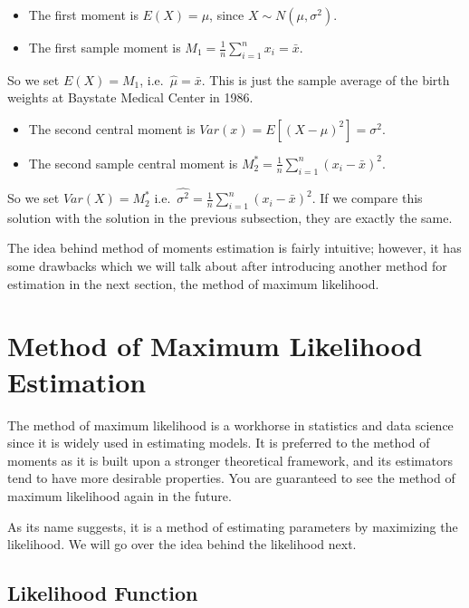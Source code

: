 \documentclass[
]{book}
\providecommand{\tightlist}{%
  \setlength{\itemsep}{0pt}\setlength{\parskip}{0pt}}
\begin{document}
\begin{itemize}
\tightlist
\item
  The first moment is \(E(X) = \mu\), since \(X \sim N(\mu, \sigma^2)\).
\item
  The first sample moment is \(M_1 = \frac{1}{n} \sum_{i=1}^n x_i = \bar{x}\).
\end{itemize}

So we set \(E(X) = M_1\), i.e.~\(\hat{\mu} = \bar{x}\). This is just the sample average of the birth weights at Baystate Medical Center in 1986.

\begin{itemize}
\tightlist
\item
  The second central moment is \(Var(x) = E[(X-\mu)^2] = \sigma^2\).
\item
  The second sample central moment is \(M_2^* = \frac{1}{n} \sum_{i=1}^n (x_i - \bar{x})^2\).
\end{itemize}

So we set \(Var(X) = M_2^*\) i.e.~\(\hat{\sigma^2} = \frac{1}{n} \sum_{i=1}^n (x_i - \bar{x})^2\). If we compare this solution with the solution in the previous subsection, they are exactly the same.

The idea behind method of moments estimation is fairly intuitive; however, it has some drawbacks which we will talk about after introducing another method for estimation in the next section, the method of maximum likelihood.

\section{Method of Maximum Likelihood Estimation}\label{method-of-maximum-likelihood-estimation}

The method of maximum likelihood is a workhorse in statistics and data science since it is widely used in estimating models. It is preferred to the method of moments as it is built upon a stronger theoretical framework, and its estimators tend to have more desirable properties. You are guaranteed to see the method of maximum likelihood again in the future.

As its name suggests, it is a method of estimating parameters by maximizing the likelihood. We will go over the idea behind the likelihood next.

\subsection{Likelihood Function}\label{likelihood-function}
\end{document}
